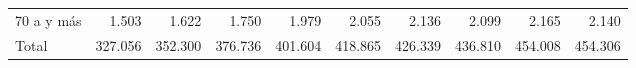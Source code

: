 \begin{tabular}{llllllllll}
\multicolumn{1}{l}{\hspace{1em}70 a y más} &
  \multicolumn{1}{|r}{1.503} &
  \multicolumn{1}{r}{1.622} &
  \multicolumn{1}{r}{1.750} &
  \multicolumn{1}{r}{1.979} &
  \multicolumn{1}{r}{2.055} &
  \multicolumn{1}{r}{2.136} &
  \multicolumn{1}{r}{2.099} &
  \multicolumn{1}{r}{2.165} &
  \multicolumn{1}{r}{2.140} \\
\multicolumn{1}{l}{\hspace{1em}Total} &
  \multicolumn{1}{|r}{327.056} &
  \multicolumn{1}{r}{352.300} &
  \multicolumn{1}{r}{376.736} &
  \multicolumn{1}{r}{401.604} &
  \multicolumn{1}{r}{418.865} &
  \multicolumn{1}{r}{426.339} &
  \multicolumn{1}{r}{436.810} &
  \multicolumn{1}{r}{454.008} &
  \multicolumn{1}{r}{454.306} \\
\cline{1-10}
\end{tabular}
